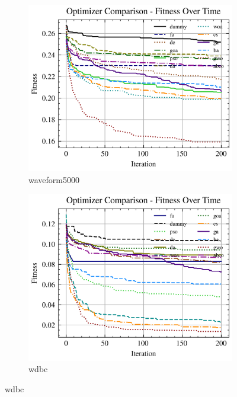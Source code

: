 \begin{figure}[htp]
\begin{subfigure}[htp]{0.45\textwidth}
    \end{subfigure}
    \begin{subfigure}[htp]{0.45\textwidth}
        \includegraphics[width=\textwidth]{imagenes/fitness_charts/img/real/waveform5000/optimizers_fitness_knn.png}
        \caption{waveform5000}
    \end{subfigure}
    \begin{subfigure}[htp]{0.45\textwidth}
        \includegraphics[width=\textwidth]{imagenes/fitness_charts/img/real/wdbc/optimizers_fitness_knn.png}
        \caption{wdbc}
    \end{subfigure}

\end{figure}
